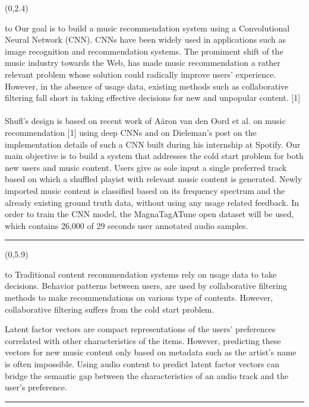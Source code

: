 \documentclass[a0]{a0poster}
\def\Head#1{
  \noindent\hbox to \hsize{\hfil{\LARGE\color{DarkBlue}\sf #1}}\bigskip}
\begin{document}
  \begin{textblock}{7}(0,2.4)
    \Head{Introduction}
    \sf %
    Our goal is to build a music recommendation system using a Convolutional
    Neural Network (CNN). CNNs have been widely used in applications such as
    image recognition and recommendation systems. The promiment shift of the
    music industry towards the Web, has made music recommendation a rather
    relevant problem whose solution could radically improve users' experience.
    However, in the absence of usage data, existing methods such as
    collaborative filtering fall short in taking effective decisions for new
    and unpopular content. [1]
    \\ \\
    Shufl's design is based on recent work of A\"{a}ron van den Oord et al. on
    music recommendation [1] using deep CNNs and on Dieleman's post on the
    implementation details of such a CNN built during his internship at
    Spotify. Our main objective is to build a system that addresses the cold
    start problem for both new users and music content. Users give as sole
    input a single preferred track based on which a shuffled playist with
    relevant music content is generated. Newly imported music content is
    classified based on its frequency spectrum and the already existing ground
    truth data, without using any usage related feedback. In order to train
    the CNN model, the MagnaTagATune open dataset will be used, which contains
    26,000 of 29 seconds user annotated audio samples.

    \bigskip
    \hrule
  \end{textblock}

  \begin{textblock}{7}(0,5.9)
    \Head{The Problem}
    \sf 
    Traditional content recommendation systems rely on usage data to take
    decisions. Behavior patterns between users, are used by collaborative
    filtering methods to make recommendations on various type of contents.
    However, collaborative filtering suffers from the cold start problem.

    Latent factor vectors are compact representations of the users'
    preferences correlated with other characteristics of the items. However,
    predicting these vectors for new music content only based on metadata such
    as the artist's name is often impossible. Using audio content to predict
    latent factor vectors can bridge the semantic gap between the
    characteristics of an audio track and the user's preference.
    \bigskip
    \hrule
  \end{textblock}
\end{document}
